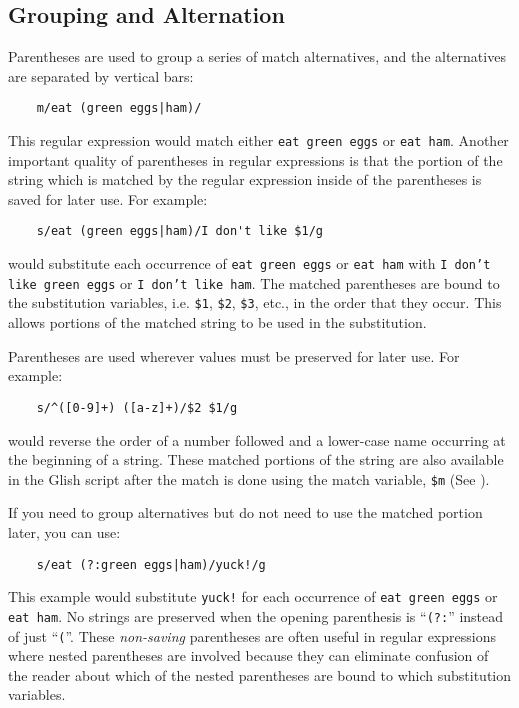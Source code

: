 \subsection{Grouping and Alternation}
Parentheses are used to group a series of match alternatives, and the alternatives
are separated by vertical bars:
\begin{verbatim}
    m/eat (green eggs|ham)/
\end{verbatim}
This regular expression would match either {\tt eat green eggs} or {\tt eat ham}. Another
important quality of parentheses in regular expressions is that the portion of 
the string which is matched by the regular expression inside of the parentheses
is saved for later use. For example:
\begin{verbatim}
    s/eat (green eggs|ham)/I don't like $1/g
\end{verbatim}
would substitute each occurrence of {\tt eat green eggs} or {\tt eat ham} with {\tt I
don't like green eggs} or {\tt I don't like ham}. The matched parentheses are bound to the
substitution variables, i.e. \verb+$1+, \verb+$2+, \verb+$3+, etc., in the order that
they occur. This allows portions of the matched string to be used in the substitution. 

Parentheses are used wherever values must be preserved for later use.
For example:
\begin{verbatim}
    s/^([0-9]+) ([a-z]+)/$2 $1/g
\end{verbatim}
would reverse the order of a number followed and a lower-case name occurring at
the beginning of a string. These matched portions of the string are also available
in the Glish script after the match is done using the match variable, \verb+$m+ (See
).

If you need to group alternatives but do not need to use the matched
portion later, you can use:
\begin{verbatim}
    s/eat (?:green eggs|ham)/yuck!/g
\end{verbatim}
This example would substitute {\tt yuck!} for each occurrence of {\tt eat green eggs}
or {\tt eat ham}. No strings are preserved when the opening parenthesis is
``\verb+(?:+'' instead of just ``\verb+(+''. These {\em non-saving}
parentheses are often useful in regular expressions where nested parentheses
are involved because they can eliminate confusion of the reader about which
of the nested parentheses are bound to which substitution variables.

